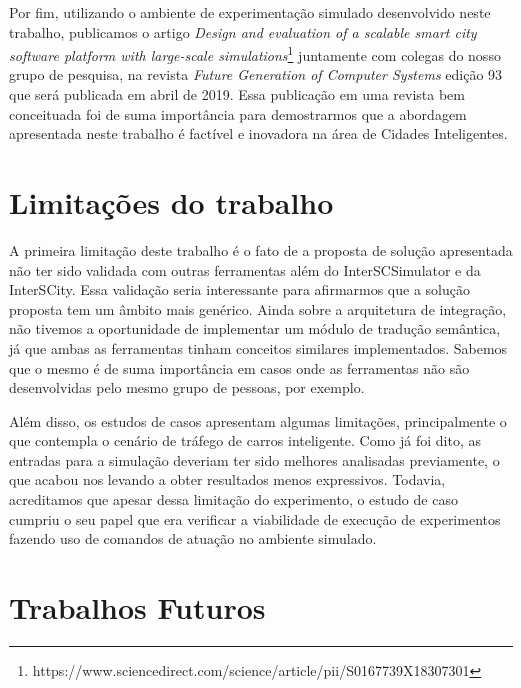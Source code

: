 Por fim, utilizando o ambiente de experimentação simulado desenvolvido neste trabalho, publicamos o artigo \textit{Design and evaluation of a scalable smart city software platform with
large-scale simulations}\footnote{https://www.sciencedirect.com/science/article/pii/S0167739X18307301} juntamente com colegas do nosso grupo de pesquisa, na revista \textit{Future Generation of
Computer Systems} edição 93 que será publicada em abril de 2019.  
Essa publicação em uma revista bem conceituada foi de suma importância para demostrarmos que a abordagem apresentada neste trabalho é factível e inovadora na área de Cidades Inteligentes.


\section{Limitações do trabalho}


A primeira limitação deste trabalho é o fato de a proposta de solução apresentada não ter sido validada com outras ferramentas além do InterSCSimulator e da InterSCity.
Essa validação seria interessante para afirmarmos que a solução proposta tem um âmbito mais genérico.
Ainda sobre a arquitetura de integração, não tivemos a oportunidade de implementar um módulo de tradução semântica, já que ambas as ferramentas tinham conceitos similares implementados.
Sabemos que o mesmo é de suma importância em casos onde as ferramentas não são desenvolvidas pelo mesmo grupo de pessoas, por exemplo.

Além disso, os estudos de casos apresentam algumas limitações, principalmente o que contempla o cenário de tráfego de carros inteligente.
Como já foi dito, as entradas para a simulação deveriam ter sido melhores analisadas previamente, o que acabou nos levando a obter resultados menos expressivos.
Todavia, acreditamos que apesar dessa limitação do experimento, o estudo de caso cumpriu o seu papel que era verificar a viabilidade de execução de experimentos fazendo uso de comandos de atuação no
ambiente simulado.

\section{Trabalhos Futuros}

%
%

